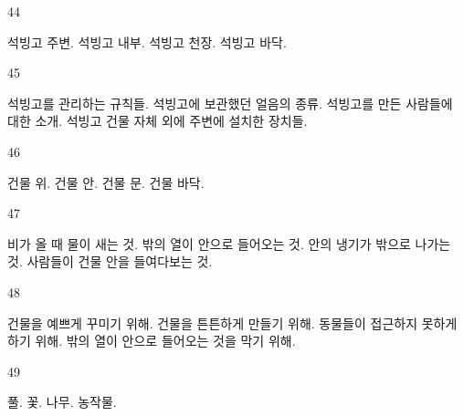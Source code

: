 \documentclass[fs9,seriesFre]{korfarm-base}
\begin{document}
\begin{kfSentenceUnit}{44}{}
\begin{kfChoices}
\kfChoice 석빙고 주변.
\kfChoice 석빙고 내부.
\kfChoice 석빙고 천장.
\kfChoice 석빙고 바닥.
\end{kfChoices}
\end{kfSentenceUnit}

\begin{kfSentenceUnit}{45}{}
\begin{kfChoices}
\kfChoice 석빙고를 관리하는 규칙들.
\kfChoice 석빙고에 보관했던 얼음의 종류.
\kfChoice 석빙고를 만든 사람들에 대한 소개.
\kfChoice 석빙고 건물 자체 외에 주변에 설치한 장치들.
\end{kfChoices}
\end{kfSentenceUnit}

\begin{kfSentenceUnit}{46}{}
\begin{kfChoices}
\kfChoice 건물 위.
\kfChoice 건물 안.
\kfChoice 건물 문.
\kfChoice 건물 바닥.
\end{kfChoices}
\end{kfSentenceUnit}

\begin{kfSentenceUnit}{47}{}
\begin{kfChoices}
\kfChoice 비가 올 때 물이 새는 것.
\kfChoice 밖의 열이 안으로 들어오는 것.
\kfChoice 안의 냉기가 밖으로 나가는 것.
\kfChoice 사람들이 건물 안을 들여다보는 것.
\end{kfChoices}
\end{kfSentenceUnit}

\begin{kfSentenceUnit}{48}{}
\begin{kfChoices}
\kfChoice 건물을 예쁘게 꾸미기 위해.
\kfChoice 건물을 튼튼하게 만들기 위해.
\kfChoice 동물들이 접근하지 못하게 하기 위해.
\kfChoice 밖의 열이 안으로 들어오는 것을 막기 위해.
\end{kfChoices}
\end{kfSentenceUnit}

\begin{kfSentenceUnit}{49}{}
\begin{kfChoices}
\kfChoice 풀.
\kfChoice 꽃.
\kfChoice 나무.
\kfChoice 농작물.
\end{kfChoices}
\end{kfSentenceUnit}
\end{document}
